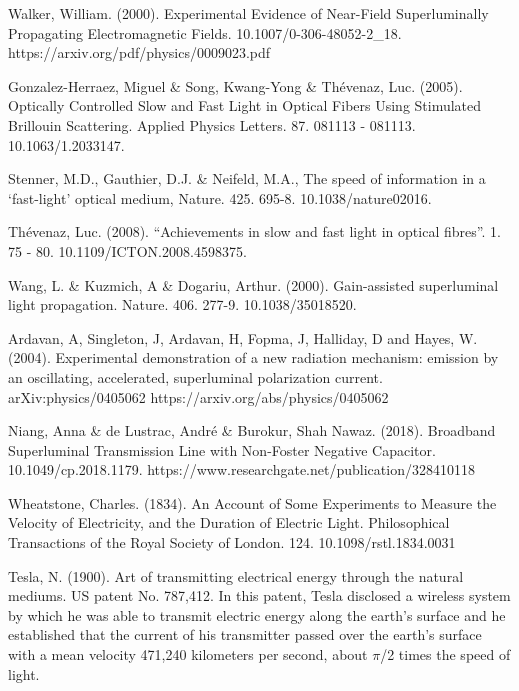 \documentclass[twoside,final]{article}
\begin{document}
{\begin{thebibliography}{99}
 Walker, William. (2000). Experimental Evidence of
Near-Field Superluminally Propagating Electromagnetic Fields.
10.1007/0-306-48052-2\_18. https://arxiv.org/pdf/physics/0009023.pdf



 Gonzalez-Herraez, Miguel \& Song, Kwang-Yong \&
Th\'evenaz, Luc. (2005). Optically Controlled Slow and Fast Light in Optical
Fibers Using Stimulated Brillouin Scattering. Applied Physics Letters. 87.
081113 - 081113. 10.1063/1.2033147. 


 Stenner, M.D., Gauthier, D.J. \& Neifeld, M.A., The speed
of information in a `fast-light' optical medium, Nature. 425. 695-8.
10.1038/nature02016. 


 Th\'evenaz, Luc. (2008). ``Achievements in slow and fast
light in optical fibres''. 1. 75 - 80. 10.1109/ICTON.2008.4598375. 

 Wang, L. \& Kuzmich, A \& Dogariu, Arthur. (2000). Gain-assisted
superluminal light propagation. Nature. 406. 277-9. 10.1038/35018520. 




 Ardavan, A, Singleton, J, Ardavan, H,  Fopma, J, Halliday,
D and Hayes, W. (2004). Experimental demonstration of a new radiation mechanism:
emission by an oscillating, accelerated, superluminal polarization current.
arXiv:physics/0405062 https://arxiv.org/abs/physics/0405062

 Niang, Anna \& de Lustrac, Andr\'e \& Burokur, Shah Nawaz.
(2018). Broadband Superluminal Transmission Line with Non-Foster Negative
Capacitor. 10.1049/cp.2018.1179.
https://www.researchgate.net/publication/328410118

 Wheatstone, Charles. (1834). An Account of Some
Experiments to Measure the Velocity of Electricity, and the Duration of Electric
Light. Philosophical Transactions of the Royal Society of London. 124.
10.1098/rstl.1834.0031

 Tesla, N. (1900). Art of transmitting electrical energy
through the natural mediums. US patent No. 787,412. In this patent, Tesla
disclosed a wireless system by which he was able to transmit electric energy
along the earth's surface and he established that the current of his transmitter
passed over the earth's surface with a mean velocity 471,240 kilometers per
second, about $\pi$/2 times the speed of light.






\end{thebibliography}}
\end{document}
